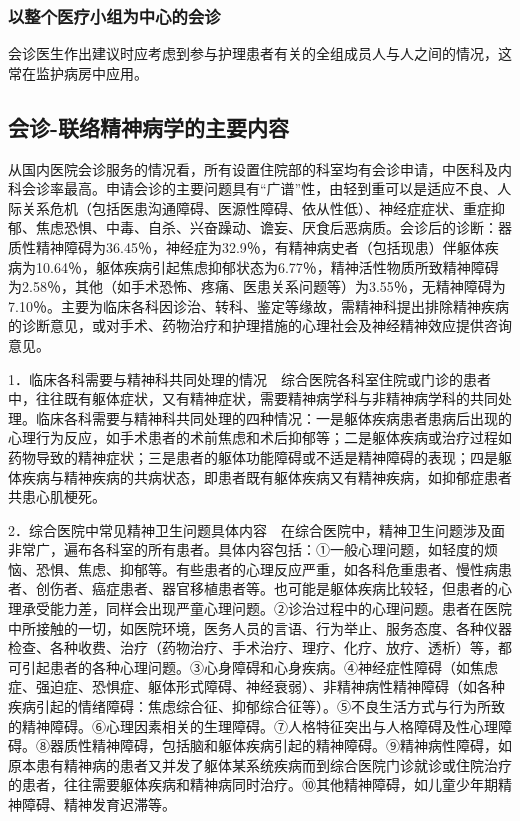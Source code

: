 \subsubsection{以整个医疗小组为中心的会诊}

会诊医生作出建议时应考虑到参与护理患者有关的全组成员人与人之间的情况，这常在监护病房中应用。

\subsection{会诊-联络精神病学的主要内容}

从国内医院会诊服务的情况看，所有设置住院部的科室均有会诊申请，中医科及内科会诊率最高。申请会诊的主要问题具有“广谱”性，由轻到重可以是适应不良、人际关系危机（包括医患沟通障碍、医源性障碍、依从性低）、神经症症状、重症抑郁、焦虑恐惧、中毒、自杀、兴奋躁动、谵妄、厌食后恶病质。会诊后的诊断：器质性精神障碍为36.45％，神经症为32.9％，有精神病史者（包括现患）伴躯体疾病为10.64％，躯体疾病引起焦虑抑郁状态为6.77％，精神活性物质所致精神障碍为2.58％，其他（如手术恐怖、疼痛、医患关系问题等）为3.55％，无精神障碍为7.10％。主要为临床各科因诊治、转科、鉴定等缘故，需精神科提出排除精神疾病的诊断意见，或对手术、药物治疗和护理措施的心理社会及神经精神效应提供咨询意见。

1．临床各科需要与精神科共同处理的情况　综合医院各科室住院或门诊的患者中，往往既有躯体症状，又有精神症状，需要精神病学科与非精神病学科的共同处理。临床各科需要与精神科共同处理的四种情况：一是躯体疾病患者患病后出现的心理行为反应，如手术患者的术前焦虑和术后抑郁等；二是躯体疾病或治疗过程如药物导致的精神症状；三是患者的躯体功能障碍或不适是精神障碍的表现；四是躯体疾病与精神疾病的共病状态，即患者既有躯体疾病又有精神疾病，如抑郁症患者共患心肌梗死。

2．综合医院中常见精神卫生问题具体内容　在综合医院中，精神卫生问题涉及面非常广，遍布各科室的所有患者。具体内容包括：①一般心理问题，如轻度的烦恼、恐惧、焦虑、抑郁等。有些患者的心理反应严重，如各科危重患者、慢性病患者、创伤者、癌症患者、器官移植患者等。也可能是躯体疾病比较轻，但患者的心理承受能力差，同样会出现严童心理问题。②诊治过程中的心理问题。患者在医院中所接触的一切，如医院环境，医务人员的言语、行为举止、服务态度、各种仪器检查、各种收费、治疗（药物治疗、手术治疗、理疗、化疗、放疗、透析）等，都可引起患者的各种心理问题。③心身障碍和心身疾病。④神经症性障碍（如焦虑症、强迫症、恐惧症、躯体形式障碍、神经衰弱）、非精神病性精神障碍（如各种疾病引起的情绪障碍：焦虑综合征、抑郁综合征等）。⑤不良生活方式与行为所致的精神障碍。⑥心理因素相关的生理障碍。⑦人格特征突出与人格障碍及性心理障碍。⑧器质性精神障碍，包括脑和躯体疾病引起的精神障碍。⑨精神病性障碍，如原本患有精神病的患者又并发了躯体某系统疾病而到综合医院门诊就诊或住院治疗的患者，往往需要躯体疾病和精神病同时治疗。⑩其他精神障碍，如儿童少年期精神障碍、精神发育迟滞等。

